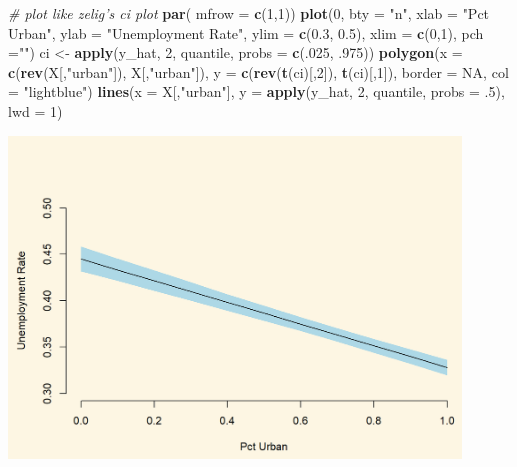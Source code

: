 \documentclass[]{article}
\newenvironment{Shaded}{\begin{snugshade}}{\end{snugshade}}
\newcommand{\CommentTok}[1]{\textcolor[rgb]{0.56,0.35,0.01}{\textit{#1}}}
\newcommand{\DataTypeTok}[1]{\textcolor[rgb]{0.13,0.29,0.53}{#1}}
\newcommand{\DecValTok}[1]{\textcolor[rgb]{0.00,0.00,0.81}{#1}}
\newcommand{\FloatTok}[1]{\textcolor[rgb]{0.00,0.00,0.81}{#1}}
\newcommand{\KeywordTok}[1]{\textcolor[rgb]{0.13,0.29,0.53}{\textbf{#1}}}
\newcommand{\NormalTok}[1]{#1}
\newcommand{\OtherTok}[1]{\textcolor[rgb]{0.56,0.35,0.01}{#1}}
\newcommand{\StringTok}[1]{\textcolor[rgb]{0.31,0.60,0.02}{#1}}
\begin{document}
\begin{Shaded}
\begin{Highlighting}[]
\CommentTok{# plot like zelig's ci plot}
\KeywordTok{par}\NormalTok{( }\DataTypeTok{mfrow =} \KeywordTok{c}\NormalTok{(}\DecValTok{1}\NormalTok{,}\DecValTok{1}\NormalTok{))}
\KeywordTok{plot}\NormalTok{(}\DecValTok{0}\NormalTok{, }\DataTypeTok{bty =} \StringTok{"n"}\NormalTok{, }\DataTypeTok{xlab =} \StringTok{"Pct Urban"}\NormalTok{, }\DataTypeTok{ylab =} \StringTok{"Unemployment Rate"}\NormalTok{, }
     \DataTypeTok{ylim =} \KeywordTok{c}\NormalTok{(}\FloatTok{0.3}\NormalTok{, }\FloatTok{0.5}\NormalTok{), }\DataTypeTok{xlim =} \KeywordTok{c}\NormalTok{(}\DecValTok{0}\NormalTok{,}\DecValTok{1}\NormalTok{), }\DataTypeTok{pch =}\StringTok{""}\NormalTok{)}
\NormalTok{ci <-}\StringTok{ }\KeywordTok{apply}\NormalTok{(y_hat, }\DecValTok{2}\NormalTok{, quantile, }\DataTypeTok{probs =} \KeywordTok{c}\NormalTok{(.}\DecValTok{025}\NormalTok{, }\FloatTok{.975}\NormalTok{))}
\KeywordTok{polygon}\NormalTok{(}\DataTypeTok{x =}  \KeywordTok{c}\NormalTok{(}\KeywordTok{rev}\NormalTok{(X[,}\StringTok{"urban"}\NormalTok{]), X[,}\StringTok{"urban"}\NormalTok{]), }
        \DataTypeTok{y =} \KeywordTok{c}\NormalTok{(}\KeywordTok{rev}\NormalTok{(}\KeywordTok{t}\NormalTok{(ci)[,}\DecValTok{2}\NormalTok{]), }\KeywordTok{t}\NormalTok{(ci)[,}\DecValTok{1}\NormalTok{]), }\DataTypeTok{border =} \OtherTok{NA}\NormalTok{,}
        \DataTypeTok{col =} \StringTok{"lightblue"}\NormalTok{)}
\KeywordTok{lines}\NormalTok{(}\DataTypeTok{x =}\NormalTok{ X[,}\StringTok{"urban"}\NormalTok{], }\DataTypeTok{y =} \KeywordTok{apply}\NormalTok{(y_hat, }\DecValTok{2}\NormalTok{, quantile, }\DataTypeTok{probs =} \FloatTok{.5}\NormalTok{), }\DataTypeTok{lwd =} \DecValTok{1}\NormalTok{)}
\end{Highlighting}
\end{Shaded}

\includegraphics[width=0.9\textwidth,height=\textheight]{./img/unnamed-chunk-184-1.png}
\end{document}
